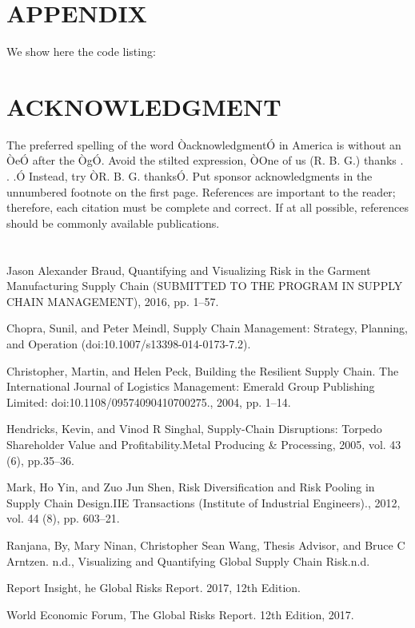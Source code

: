 \documentclass[conference]{IEEEtran}
\begin{document}
\section*{APPENDIX}
We show here the code listing:

\section*{ACKNOWLEDGMENT}
The preferred spelling of the word ÒacknowledgmentÓ in America is without an ÒeÓ after the ÒgÓ. Avoid the stilted expression, ÒOne of us (R. B. G.) thanks . . .Ó  Instead, try ÒR. B. G. thanksÓ. Put sponsor acknowledgments in the unnumbered footnote on the first page.
References are important to the reader; therefore, each citation must be complete and correct. If at all possible, references should be commonly available publications.
\section*{}
\begin{thebibliography}{99}
 Jason Alexander Braud, Quantifying and Visualizing Risk in the Garment Manufacturing Supply Chain (SUBMITTED TO THE PROGRAM IN SUPPLY CHAIN MANAGEMENT), 2016, pp. 1–57.

 Chopra, Sunil, and Peter Meindl, Supply Chain Management: Strategy, Planning, and Operation (doi:10.1007/s13398-014-0173-7.2).

 Christopher, Martin, and Helen Peck, Building the Resilient Supply Chain. The International Journal of Logistics Management: Emerald Group Publishing Limited: doi:10.1108/09574090410700275., 2004, pp. 1–14.

 Hendricks, Kevin, and Vinod R Singhal, Supply-Chain Disruptions: Torpedo Shareholder Value and Profitability.Metal Producing \& Processing, 2005, vol. 43 (6), pp.35–36.

 Mark, Ho Yin, and Zuo Jun Shen, Risk Diversification and Risk Pooling in Supply Chain Design.IIE Transactions (Institute of Industrial Engineers)., 2012, vol. 44 (8), pp. 603–21.

 Ranjana, By, Mary Ninan, Christopher Sean Wang, Thesis Advisor, and Bruce C Arntzen. n.d., Visualizing and Quantifying Global Supply Chain Risk.n.d.

 Report Insight, he Global Risks Report. 2017, 12th Edition.

 World Economic Forum, The Global Risks Report. 12th Edition, 2017.
\end{thebibliography}
\end{document}
